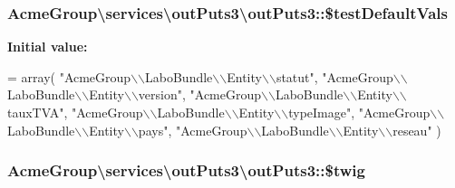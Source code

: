 \hypertarget{class_acme_group_1_1services_1_1out_puts3_1_1out_puts3_a47933923b5d18a1edc82626e9ef31a05}{
\subsubsection[{\$test\+Default\+Vals}]{\setlength{\rightskip}{0pt plus 5cm}Acme\+Group\textbackslash{}services\textbackslash{}out\+Puts3\textbackslash{}out\+Puts3\+::\$test\+Default\+Vals\hspace{0.3cm}{\ttfamily [protected]}}}\label{class_acme_group_1_1services_1_1out_puts3_1_1out_puts3_a47933923b5d18a1edc82626e9ef31a05}
{\bfseries Initial value\+:}
\begin{DoxyCode}
= array(
        \textcolor{stringliteral}{"AcmeGroup\(\backslash\)\(\backslash\)LaboBundle\(\backslash\)\(\backslash\)Entity\(\backslash\)\(\backslash\)statut"},
        \textcolor{stringliteral}{"AcmeGroup\(\backslash\)\(\backslash\)LaboBundle\(\backslash\)\(\backslash\)Entity\(\backslash\)\(\backslash\)version"},
        \textcolor{stringliteral}{"AcmeGroup\(\backslash\)\(\backslash\)LaboBundle\(\backslash\)\(\backslash\)Entity\(\backslash\)\(\backslash\)tauxTVA"},
        \textcolor{stringliteral}{"AcmeGroup\(\backslash\)\(\backslash\)LaboBundle\(\backslash\)\(\backslash\)Entity\(\backslash\)\(\backslash\)typeImage"},
        \textcolor{stringliteral}{"AcmeGroup\(\backslash\)\(\backslash\)LaboBundle\(\backslash\)\(\backslash\)Entity\(\backslash\)\(\backslash\)pays"},
        \textcolor{stringliteral}{"AcmeGroup\(\backslash\)\(\backslash\)LaboBundle\(\backslash\)\(\backslash\)Entity\(\backslash\)\(\backslash\)reseau"}
        )
\end{DoxyCode}
\hypertarget{class_acme_group_1_1services_1_1out_puts3_1_1out_puts3_a8b5306cdaa18606939b984848e1bdb35}{
\subsubsection[{\$twig}]{\setlength{\rightskip}{0pt plus 5cm}Acme\+Group\textbackslash{}services\textbackslash{}out\+Puts3\textbackslash{}out\+Puts3\+::\$twig\hspace{0.3cm}{\ttfamily [protected]}}}\label{class_acme_group_1_1services_1_1out_puts3_1_1out_puts3_a8b5306cdaa18606939b984848e1bdb35}
